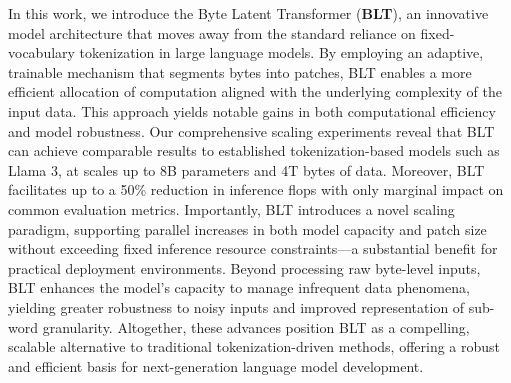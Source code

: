 In this work, we introduce the Byte Latent Transformer (\textbf{BLT}), an innovative model architecture that moves away from the standard reliance on fixed-vocabulary tokenization in large language models. By employing an adaptive, trainable mechanism that segments bytes into patches, {\textsc BLT} enables a more efficient allocation of computation aligned with the underlying complexity of the input data. This approach yields notable gains in both computational efficiency and model robustness. Our comprehensive scaling experiments reveal that {\textsc BLT} can achieve comparable results to established tokenization-based models such as Llama 3, at scales up to 8B parameters and 4T bytes of data. Moreover, {\textsc BLT} facilitates up to a 50\% reduction in inference flops with only marginal impact on common evaluation metrics. Importantly, {\textsc BLT} introduces a novel scaling paradigm, supporting parallel increases in both model capacity and patch size without exceeding fixed inference resource constraints—a substantial benefit for practical deployment environments. Beyond processing raw byte-level inputs, {\textsc BLT} enhances the model's capacity to manage infrequent data phenomena, yielding greater robustness to noisy inputs and improved representation of sub-word granularity. Altogether, these advances position {\textsc BLT} as a compelling, scalable alternative to traditional tokenization-driven methods, offering a robust and efficient basis for next-generation language model development.

